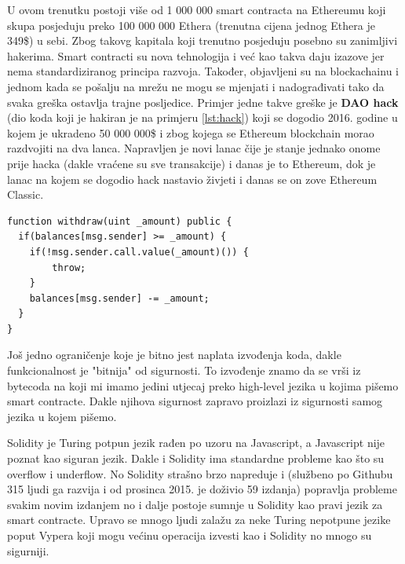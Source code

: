\documentclass[12pt]{report}
\begin{document}
U ovom trenutku postoji više od 1 000 000 smart contracta na Ethereumu koji skupa posjeduju preko 100 000 000 Ethera (trenutna cijena jednog Ethera je 349\$) u sebi. Zbog takovg kapitala koji trenutno posjeduju posebno su zanimljivi hakerima. Smart contracti su nova tehnologija i već kao takva daju izazove jer nema standardiziranog principa razvoja. Također, objavljeni su na blockachainu i jednom kada se pošalju na mrežu ne mogu se mjenjati i nadograđivati tako da svaka greška ostavlja trajne posljedice. Primjer jedne takve greške je \textbf{DAO hack} (dio koda koji je hakiran je na primjeru \ref{lst:hack}) koji se dogodio 2016. godine u kojem je ukradeno 50 000 000\$ i zbog kojega se Ethereum blockchain morao razdvojiti na dva lanca. Napravljen je novi lanac čije je stanje jednako onome prije hacka (dakle vraćene su sve transakcije) i danas je to Ethereum, dok je lanac na kojem se dogodio hack nastavio živjeti i danas se on zove Ethereum Classic.

\begin{minipage}{\linewidth}
\begin{lstlisting}[caption = Ukratko: DAO je jedna od drugih valuta na Ethereumu koja je imala svoju protuvrijednost u Etheru. Funkcija witdraw jednostavno povlači sredstva koje account ima na smart contractu. No što ako damo hrpu zahtjeva odjednom? Tada se sredstva konstantno prebacuju na account no na smart contractu se ne stigne smanjiti, language=solidity, label={lst:hack}]
function withdraw(uint _amount) public {
  if(balances[msg.sender] >= _amount) {
    if(!msg.sender.call.value(_amount)()) { 
        throw;
    }
    balances[msg.sender] -= _amount;
  }
}
\end{lstlisting}
\end{minipage}

Još jedno ograničenje koje je bitno jest naplata izvođenja koda, dakle funkcionalnost je "bitnija" od sigurnosti. To izvođenje znamo da se vrši iz bytecoda na koji mi imamo jedini utjecaj preko high-level jezika u kojima pišemo smart contracte. Dakle njihova sigurnost zapravo proizlazi iz sigurnosti samog jezika u kojem pišemo.

Solidity je Turing potpun jezik rađen po uzoru na Javascript, a Javascript nije poznat kao siguran jezik. Dakle i Solidity ima standardne probleme kao što su overflow i underflow. No Solidity strašno brzo napreduje i (službeno po Githubu 315 ljudi ga razvija i od prosinca 2015. je doživio 59 izdanja) popravlja probleme svakim novim izdanjem no i dalje postoje sumnje u Solidity kao pravi jezik za smart contracte. Upravo se mnogo ljudi zalažu za neke Turing nepotpune jezike poput Vypera koji mogu većinu operacija izvesti kao i Solidity no mnogo su sigurniji.
\end{document}
